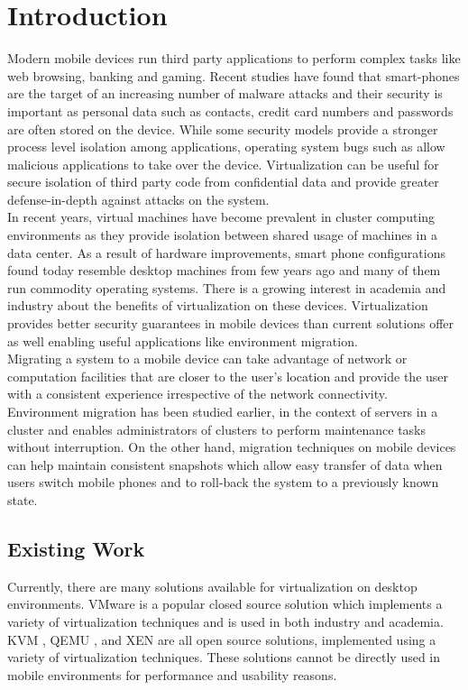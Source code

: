 \section{Introduction}
Modern mobile devices run third party applications to perform complex tasks like web browsing, banking and gaming. Recent studies have found that smart-phones are the target of an increasing number of malware attacks \cite{bose2006mobile, cybercriminals2007banks, iphone2010seriot} and their security is important as personal data such as contacts, credit card numbers and passwords are often stored on the device. While some security models \cite{androidsecurity} provide a stronger process level isolation among applications, operating system bugs such as \cite{sms2009iphone,opencore2009android,kernel2009vulnerability} allow malicious applications to take over the device. Virtualization can be useful for secure isolation of third party code from confidential data and provide greater defense-in-depth against attacks on the system.\\

In recent years, virtual machines have become prevalent in cluster computing environments \cite{gartner2009virtual} as they provide isolation between shared usage of machines in a data center. As a result of hardware improvements, smart phone configurations found today resemble desktop machines from few years ago and many of them run commodity operating systems. There is a growing interest in academia \cite{cox2007pocket} and industry \cite{vmware2009nextfrontier} about the benefits of virtualization on these devices. Virtualization provides better security guarantees in mobile devices than current solutions offer as well enabling useful applications like environment migration. \\


Migrating a system to a mobile device can take advantage of network or computation facilities that are closer to the user's location and provide the user with a consistent experience irrespective of the network connectivity. Environment migration has been studied earlier, in the context of servers in a cluster \cite{clark2005live} and enables administrators of clusters to perform maintenance tasks without interruption. On the other hand, migration techniques on mobile devices can help maintain consistent snapshots which allow easy transfer of data when users switch mobile phones and to roll-back the system to a previously known state.

\subsection{Existing Work}
Currently, there are many solutions available for virtualization on desktop environments.  VMware is a popular closed source solution which implements a variety of virtualization techniques and is used in both industry and academia.  KVM \cite{kvm}, QEMU \cite{qemu}, and XEN \cite{xen} are all open source solutions, implemented using a variety of virtualization techniques.  These solutions cannot be directly used in mobile environments for performance and usability reasons. \\

